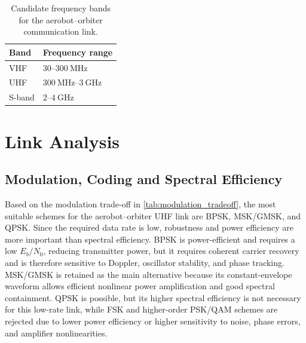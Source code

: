\begin{table}[H]
    \centering
    \small
    \caption{Candidate frequency bands for the aerobot--orbiter communication link.}
    \label{tab:aerobot_orbiter_frequency_bands}
    \begin{tabular}{p{} p{}}
        \hline
        \textbf{Band} & \textbf{Frequency range} \\
        \hline
        VHF & $30$--$300~\mathrm{MHz}$ \\
        \hline
        UHF & $300~\mathrm{MHz}$--$3~\mathrm{GHz}$ \\
        \hline
        S-band & $2$--$4~\mathrm{GHz}$ \\
        \hline
    \end{tabular}
\end{table}

\section{Link Analysis}
\subsection{Modulation, Coding and Spectral Efficiency}
Based on the modulation trade-off in \autoref{tab:modulation_tradeoff}, the most suitable schemes for the aerobot--orbiter UHF link are BPSK, MSK/GMSK, and QPSK. Since the required data rate is low, robustness and power efficiency are more important than spectral efficiency. BPSK is power-efficient and requires a low \(E_b/N_0\), reducing transmitter power, but it requires coherent carrier recovery and is therefore sensitive to Doppler, oscillator stability, and phase tracking. MSK/GMSK is retained as the main alternative because its constant-envelope waveform allows efficient nonlinear power amplification and good spectral containment. QPSK is possible, but its higher spectral efficiency is not necessary for this low-rate link, while FSK and higher-order PSK/QAM schemes are rejected due to lower power efficiency or higher sensitivity to noise, phase errors, and amplifier nonlinearities.


